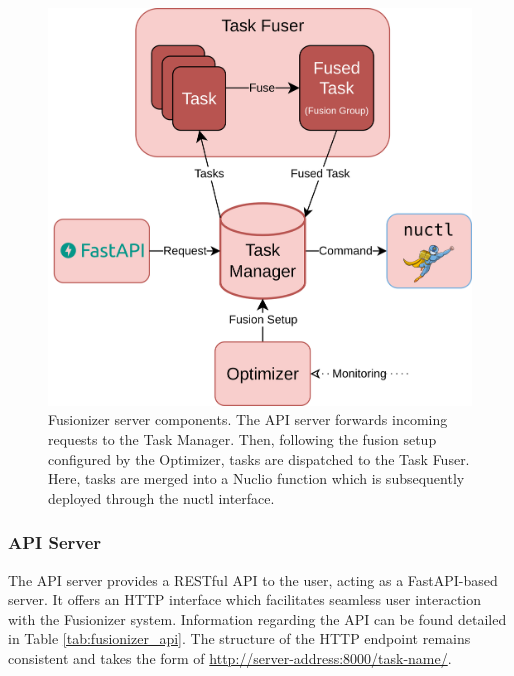 \begin{figure}
    \centering
    \includegraphics[width=.8\linewidth]{figures/fusionizer_components}
    \caption{
        Fusionizer server components. The API server forwards incoming requests
        to the Task Manager. Then, following the fusion setup configured by the
        Optimizer, tasks are dispatched to the Task Fuser. Here, tasks are
        merged into a Nuclio function which is subsequently deployed through the
        nuctl interface.
    }
    \label{fig:fusionizer_components}
\end{figure}

\subsubsection{API Server}


The API server provides a RESTful API to the user, acting as a FastAPI-based
server. It offers an HTTP interface which facilitates seamless user interaction
with the Fusionizer system. Information regarding the API can be found detailed
in Table \ref{tab:fusionizer_api}. The structure of the HTTP endpoint remains
consistent and takes the form of \url{http://server-address:8000/task-name/}.

